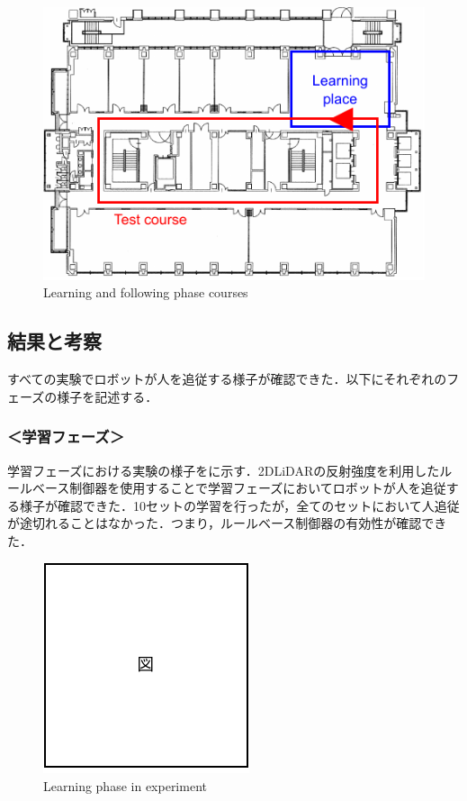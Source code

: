   \begin{figure}[h]
    \centering
    \includegraphics[keepaspectratio, scale=0.70] {images/pdf/RobotGuidance_course}
    \captionsetup{justification=raggedright} %
    \caption{Learning and following phase courses}
    \label{Fig:RobotGuidance_course}
  \end{figure}

\newpage

\subsection{結果と考察}

  すべての実験でロボットが人を追従する様子が確認できた．以下にそれぞれのフェーズの様子を記述する．

  \subsubsection*{＜学習フェーズ＞}
  
  学習フェーズにおける実験の様子をに示す．2DLiDARの反射強度を利用したルールベース制御器を使用することで学習フェーズにおいてロボットが人を追従する様子が確認できた．10セットの学習を行ったが，全てのセットにおいて人追従が途切れることはなかった．つまり，ルールベース制御器の有効性が確認できた．

  \begin{figure}[h]
    \centering
    \includegraphics[keepaspectratio, scale=0.80] {images/pdf/figure}
    \captionsetup{justification=raggedright} %
    \caption{Learning phase in experiment}
    \label{Fig:Learning phase in experiment}
  \end{figure}

